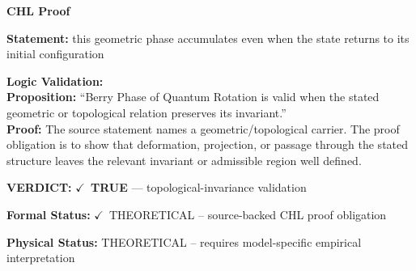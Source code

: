 \vspace{0.45em}
\noindent\textbf{CHL Proof}\par
\textbf{Statement:} this geometric phase accumulates even when the state returns to its initial
configuration

\textbf{Logic Validation:}\\
\textbf{Proposition:} ``Berry Phase of Quantum Rotation is valid when the stated geometric or topological
relation preserves its invariant.''\\
\textbf{Proof:} The source statement names a geometric/topological carrier. The proof obligation is to
show that deformation, projection, or passage through the stated structure leaves the
relevant invariant or admissible region well defined.

\textbf{VERDICT:} \ensuremath{\checkmark}\ \textbf{TRUE} --- topological-invariance validation

\textbf{Formal Status:} \ensuremath{\checkmark}\ THEORETICAL -- source-backed CHL proof obligation

\textbf{Physical Status:} THEORETICAL -- requires model-specific empirical interpretation
\par\vspace{0.45em}
\par
\ifTZPDarkEdition
{}
\fi
\endgroup
\endgroup
